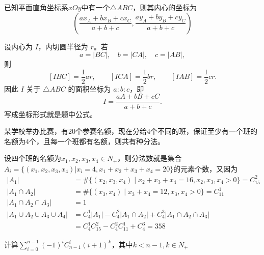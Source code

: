 \begin{example}[三角形的内心坐标]
    已知平面直角坐标系$xOy$中有一个$\triangle{ABC}$，则其内心的坐标为\[
    \left(\dfrac{ax_A+bx_B+cx_C}{a+b+c},\dfrac{ay_A+by_B+cy_C}{a+b+c}\right)
    \]
\end{example}
\begin{solution}
设内心为 $I$，内切圆半径为 $r$。若
\[
a=|BC|,\quad b=|CA|,\quad c=|AB|,
\]
则
\[
[IBC]=\frac12ar,\qquad [ICA]=\frac12br,\qquad [IAB]=\frac12cr.
\]
因此 $I$ 关于 $\triangle ABC$ 的面积坐标为 $a:b:c$，即
\[
I=\frac{aA+bB+cC}{a+b+c}.
\]
写成坐标形式就是题中公式。
\end{solution}
\begin{example}[容斥原理练习]
    某学校举办比赛，有$20$个参赛名额，现在分给$4$个不同的班，保证至少有一个班的名额为$4$个，且每一个班都有名额，则共有\underline{\hspace{1cm}}种分法。
\end{example}
\begin{solution}
    设四个班的名额为$x_1,x_2,x_3,x_4\in N_+$，则分法数就是集合$A_i=\{(x_1,x_2,x_3,x_4)|x_i=4,x_1+x_2+x_3+x_4=20\}$的元素个数，又因为
    \begin{align*}|A_{1}|&=\#\{(x_{2},x_{3},x_{4})\mid x_{2}+x_{3}+x_{4}=16,x_{2},x_{3},x_{4}>0\}=C_{15}^{2}\\|A_{1}\cap A_{2}|&=\#\{(x_{3},x_{4})\mid x_{3}+x_{4}=12,x_{3},x_{4}>0\}=C_{11}^{1}\\|A_{1}\cap A_{2}\cap A_{3}|&=1\\
    |A_1\cup A_2\cup A_3\cup A_4|&=C_4^1|A_1|-C_4^2|A_1\cap A_2|+C_4^3|A_1\cap A_2\cap A_3|\\
        &=C_4^1C_{15}^2-C_4^2C_{11}^1+C_4^3=358\end{align*}
\end{solution}
\newpage
\begin{example}[求和]
    计算$\displaystyle \sum_{i=0}^{n-1}(-1)^{i}C_{n-1}^{i}(i+1)^k$，其中$k<n-1,k\in N_+$
\end{example}
